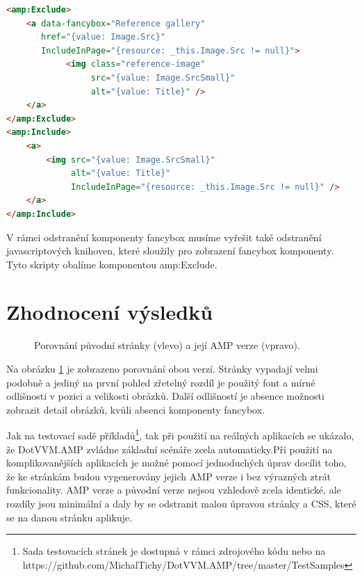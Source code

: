 \begin{lstlisting}[language=html, caption=Odstranění komponenty fancybox.,label=fancybox,captionpos=t]
<amp:Exclude>
	<a data-fancybox="Reference gallery"
	   href="{value: Image.Src}"
	   IncludeInPage="{resource: _this.Image.Src != null}">
	        <img class="reference-image"
	             src="{value: Image.SrcSmall}"
	             alt="{value: Title}" />
	</a>
</amp:Exclude>
<amp:Include>
	<a>
		<img src="{value: Image.SrcSmall}"
		     alt="{value: Title}"
		     IncludeInPage="{resource: _this.Image.Src != null}" />
	</a>
</amp:Include>

\end{lstlisting}

V rámci odstranění komponenty fancybox musíme vyřešit také odstranění javascriptových knihoven, které sloužily pro zobrazení fancybox komponenty. Tyto skripty obalíme komponentou amp:Exclude.


\section*{Zhodnocení výsledků}

\begin{figure}[hbt]
\hspace{-20px}
	\caption{Porovnání původní stránky (vlevo) a její AMP verze (vpravo).}
	\label{originalVSamp}
\end{figure}

Na obrázku \ref{originalVSamp} je zobrazeno porovnání obou verzí. Stránky vypadají velmi podobně a jediný na první pohled zřetelný rozdíl je použitý font a mírné odlišnosti v pozici a velikosti obrázků. Další odlišností je absence možnosti zobrazit detail obrázků, kvůli absenci komponenty fancybox.

Jak na testovací sadě příkladů\footnote{ Sada testovacích stránek je dostupná v rámci zdrojového kódu nebo na https://github.com/MichalTichy/DotVVM.AMP/tree/master/TestSamples}, tak při použití na reálných aplikacích se ukázalo, že DotVVM.AMP zvládne základní scénáře zcela automaticky.Při použití na komplikovanějších aplikacích je možné pomocí jednoduchých úprav docílit toho, že ke stránkám budou vygenerovány jejich AMP verze i bez výrazných ztrát funkcionality. AMP verze a původní verze nejsou vzhledově zcela identické, ale rozdíly jsou minimální a daly by se odstranit malou úpravou stránky a CSS, které se na danou stránku aplikuje.

